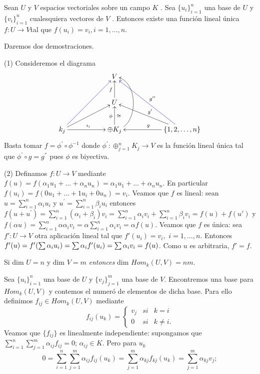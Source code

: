  		\begin{pro}
 			Sean $ U $ y $ V $  espacios vectoriales sobre un campo $ K $ .
 			Sea $ \{u_{i} \}^{n}_{i=1} $ una base de $ U $ y $  \{v_{i} \}^{n}_{i=1} $ cualesquiera vectores de $ V $ . Entonces
 			existe una función lineal única $ f : U \rightarrow V  $tal que $ f(u_{i} ) = v_{i}, i = 1, \ldots , n $.
 		\end{pro}
 		\begin{demo}
 			\normalfont
 			Daremos dos demostraciones.
 			
 			(1) Consideremos el diagrama
 			\[ \xymatrix
 			{
 			& &V& &\\
 			&& \ar[u]^{f} U &&\\
 			 \ar@[blue][uurr] \ar[urr]  \ar[rr]^{\imath_{i}}k_{j} && \ar[u]^{\phi}_{\cong}\oplus K_{j} \ar@(r,r)[uu]&  &\ar[ll]_{g} \ar[ull]_{g'} \ar@[blue][uull]_{g''} \{ 1, 2, \ldots, n \} 
 			} \]
 		 Basta tomar $ f = \phi^{'} \circ \phi^{-1} $ donde $ \phi^{'}  : \oplus^{n}_{j=1}  K_{j} \rightarrow V $ es la función
 		lineal única tal que $ \phi^{'} \circ g=g^{''} $ pues $ \phi $ es biyectiva.
 		
 		(2) Definamos $ f:U \rightarrow V $ mediante $ f(u) = f(\alpha_{1}u_{1}+\ldots+\alpha_{n}u_{n}) = \alpha_{1}u_{1}+\ldots+\alpha_{n}u_{n} $. En particular $ f(u_{i}) = f(0u_{1}+\ldots+1u_{i}+0u_{n}) = v_{i} $. Veamos que $ f $ es lineal: sean $ u = \sum_{i=1}^{n} \alpha_{i} u_{i} $ y $ u^{'} = \sum_{i=1}^{n}\beta_{i}u_{i} $ entonces $ f(u+u^{'}) = \sum_{i=1}^{n}(\alpha_{i}+\beta_{i})v_{i} =  \sum_{i=1}^{n} \alpha_{i} v_{i}+ \sum_{i=1}^{n} \beta_{i} v_{i} = f(u) + f(u')$ y $ f(\alpha u) =  \sum_{i=1}^{n} \alpha \alpha_{i} v_{i} = \alpha  \sum_{i=1}^{n} \alpha_{i} v_{i} = \alpha f(u)$. Veamos que $ f $ es única: sea $ f': U \rightarrow V $   otra aplicación lineal tal que $ f'(u_{i}) = v_{i},$ $ i = 1, \ldots, n $. Entonces $ f'(u) = f'(\sum \alpha_{i} u_{i})  = \sum \alpha_{i} f'(u_{i})  \newline = \sum \alpha_{i} v_{i} = f(u)$. Como $ u $ es arbitraria, $ f' = f $. 
 		\end{demo}
 		\begin{teo} \label{teorema1.6}
 		\normalfont 	Si dim $ U = n $ y dim $ V = m $ \textit{entonces} dim $ H om_{k} (U, V) = nm $.
 		\end{teo}
 		\begin{demo}
 			\normalfont Sea $ \{u_{i}\}^{n}_{i=1} $ una base de $ U $ y $ \{v_{j}\}^{m}_{j=1} $ una base de $ V $. Encontremos una base para $ H om_{k} (U, V) $ y contemos el numeró de elementos de dicha base. Para ello definimos $ f_{ij} \in H om_{k}(U, V)$ mediante \[ f_{ij}(u_{k}) = \left\{ \begin{array}{ccc}
 			v_{j} & si & k = i \\
 			0 & si & k \not= i.
 			\end{array}
 			\right. \]
 			Veamos que $ \{f_{ij} \} $ es linealmente independiente: supongamos que $ \sum_{i=1}^{n} \sum_{j=1}^{m} \alpha_{ij} f_{ij} = 0 $;  $\alpha_{ij} \in K$. Pero para $ u_{k} $ 
 			\[  0 = \sum_{i=1}^{n} \sum_{j=1}^{m} \alpha_{ij} f_{ij} (u_{k}) = \sum_{j=1}^{m} \alpha_{kj} f_{kj}(u_{k}) = \sum_{j=1}^{m} \alpha_{kj}v_{j}; \]
 		\end{demo}

